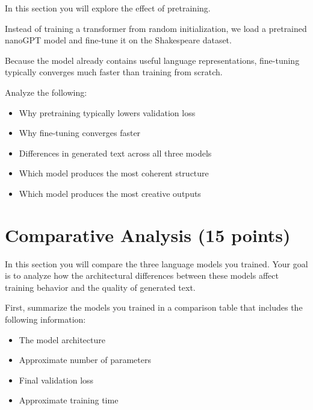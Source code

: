 In this section you will explore the effect of pretraining.

Instead of training a transformer from random initialization, we load a
pretrained nanoGPT model and fine-tune it on the Shakespeare dataset.

Because the model already contains useful language representations,
fine-tuning typically converges much faster than training from scratch.

\begin{solution}

Analyze the following:

\begin{itemize}

\item Why pretraining typically lowers validation loss
\item Why fine-tuning converges faster
\item Differences in generated text across all three models
\item Which model produces the most coherent structure
\item Which model produces the most creative outputs

\end{itemize}

\end{solution}

\section{Comparative Analysis (15 points)}

In this section you will compare the three language models you trained. Your goal is to analyze how the architectural differences between these
models affect training behavior and the quality of generated text.

First, summarize the models you trained in a comparison table that includes
the following information:

\begin{itemize}

\item The model architecture

\item Approximate number of parameters

\item Final validation loss

\item Approximate training time

\end{itemize}

